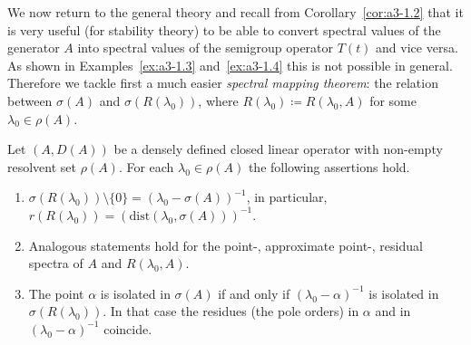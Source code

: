We now return to the general theory and recall from Corollary~\ref{cor:a3-1.2} that it is very useful (\eg for stability theory) to be able to convert
spectral values of the generator $A$ into spectral values of the semigroup operator $T(t)$ and vice versa.
As shown in Examples~\ref{ex:a3-1.3} and~\ref{ex:a3-1.4} this is not possible in general.
Therefore we tackle first a much easier \emph{spectral mapping theorem}: the relation between $\sigma(A)$ and $\sigma(R(\lambda_{0}))$, where $R(\lambda_{0}) \coloneqq R(\lambda_{0},A)$ for some $\lambda_{0} \in \rho(A)$.
\begin{proposition}\label{prop:a3-2.5}
Let $(A,D(A))$ be a densely defined closed linear operator with non-empty resolvent set $\rho(A)$.
For each $\lambda_{0} \in \rho(A)$ the following assertions hold.
\begin{enumerate}[\upshape (i)]
\item 
$\sigma(R(\lambda_{0})) \setminus \{0\} = (\lambda_{0} - \sigma(A))^{-1}$, in  particular, $r(R(\lambda_{0})) = (\mathrm{dist}(\lambda_{0},\sigma(A)))^{-1}$.

\item 
Analogous statements hold for the point-, approximate point-, residual spectra of\/ $A$ and $R(\lambda_{0},A)$.

\item 
The point $\alpha$ is isolated in $\sigma(A)$ if and only if\/ $(\lambda_{0}-\alpha)^{-1}$ is isolated in $\sigma(R(\lambda_{0}))$.
In that case the residues (\resp the pole orders) in $\alpha$ and in $(\lambda_{0}-\alpha)^{-1}$ coincide.
\end{enumerate}
\end{proposition}
